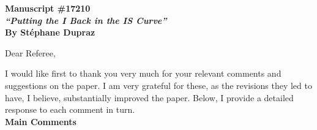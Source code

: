 \documentclass[11pt]{article}
\begin{document}
\setlength{\headheight}{25pt}
\pagestyle{fancy}
\lfoot{}
\cfoot{\thepage}
\rfoot{}
\renewcommand{\headrulewidth}{0.5pt}
\renewcommand{\footrulewidth}{0.0pt}



\noindent \textbf{Manuscript \#17210}\\
\noindent  \textbf{\emph{``Putting the I Back in the IS Curve''}}\\
\textbf{By St\'ephane Dupraz}

\singlespacing

\bigskip
\bigskip

\noindent Dear Referee,

\bigskip
\medskip

\noindent I would like first to thank you very much for your relevant comments and suggestions on the paper. I am very grateful for these, as the revisions they led to have, I believe, substantially improved the paper. Below, I provide a detailed response to each comment in turn.\\

\noindent \textbf{Main Comments}\\
\end{document}
